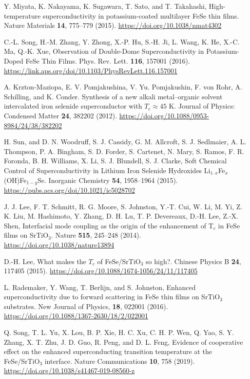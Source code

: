 \documentclass[prb,twocolumn,amsmath,amssymb,superscriptaddress,floatfix,nofootinbib]{revtex4-2}
\begin{document}
\begin{thebibliography}{}
Y. Miyata, K. Nakayama, K. Sugawara, T. Sato, and T. Takahashi, {High-temperature superconductivity in potassium-coated multilayer {FeSe} thin films}.  Nature Materials {\bf 14}, 775--779 (2015). \url{https://doi.org/10.1038/nmat4302}

C.-L. Song, H.-M. Zhang, Y. Zhong, X.-P. Hu, S.-H. Ji, L. Wang, K. He, X.-C. Ma, Q.-K. Xue, {Observation of Double-Dome Superconductivity in Potassium-Doped {FeSe} Thin Films}. {Phys. Rev. Lett.} {\bf 116}, {157001} (2016). 
\url{https://link.aps.org/doi/10.1103/PhysRevLett.116.157001}

A. Krzton-Maziopa, E. V. Pomjakushina, V. Yu. Pomjakushin, F. von Rohr, A. Schilling, and K. Conder. {Synthesis of a new alkali metal--organic solvent intercalated iron selenide superconductor {with $T_c \approx 45$ K}}. 
Journal of Physics: Condensed Matter {\bf 24}, 382202 (2012). \url{https://doi.org/10.1088/0953-8984/24/38/382202}

H. Sun, and D. N. Woodruff, S. J. Cassidy,  G. M. Allcroft, S. J. Sedlmaier, A. L. Thompson, P. A. Bingham, S. D. Forder, S. Cartenet, N. Mary, S. Ramos, F. R. Foronda, B. H. Williams, X. Li, S. J. Blundell, S. J. Clarke, {Soft Chemical Control of Superconductivity in Lithium Iron Selenide Hydroxides {Li$_{1–x}$Fe$_x$(OH)Fe$_{1-y}$Se}}. 
Inorganic Chemistry {\bf 54}, 1958--1964 (2015). \url{https://pubs.acs.org/doi/10.1021/ic5028702}

J. J. Lee, F. T. Schmitt, R. G. Moore, S. Johnston, Y.-T. Cui, W. Li, M. Yi, Z. K. Liu, M. Hashimoto, Y. Zhang, D. H. Lu, T. P. Devereaux, D.-H. Lee, Z.-X. Shen, 
{Interfacial mode coupling as the origin of the enhancement of {T$_c$} in {FeSe} films on {SrTiO$_3$}}. Nature {\bf 515}, {245--248} (2014). \url{https://doi.org/10.1038/nature13894}

D.-H. Lee, {What makes the {$T_c$} of {FeSe}/{SrTiO$_3$} so high?}. Chinese Physics B {\bf 24}, {117405} (2015). \url{https://doi.org/10.1088/1674-1056/24/11/117405}
	
L. Rademaker, Y. Wang, T. Berlijn, and S. Johnston, {Enhanced superconductivity due to forward scattering in {FeSe} thin films on {SrTiO$_3$} substrates}. 
{New Journal of Physics}, {\bf 18}, 022001 (2016). \url{https://doi.org/10.1088/1367-2630/18/2/022001}
	
Q. Song, T. L. Yu, X. Lou, B. P. Xie, H. C. Xu, C. H. P. Wen, Q. Yao, S. Y. Zhang, X. T. Zhu, J. D. Guo, R. Peng, and D. L. Feng, {Evidence of cooperative effect on the enhanced superconducting transition temperature at the {FeSe}/{SrTiO$_3$} interface}. Nature Communications {\bf 10}, 758 (2019). 
\url{https://doi.org/10.1038/s41467-019-08560-z}


\end{thebibliography}
\end{document}

